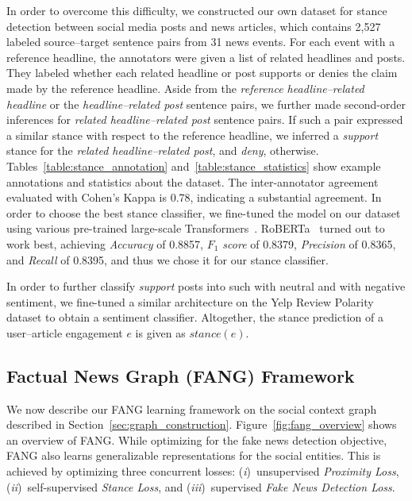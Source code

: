 \documentclass[sigconf]{acmart}
\theoremstyle{definition}
\theoremstyle{hypothesis}
\begin{document}
In order to overcome this difficulty, we constructed our own dataset for stance detection between social media posts and news articles, which contains 2,527 labeled source--target sentence pairs from 31 news events. For each event with a reference headline, the annotators were given a list of related headlines and posts. They labeled whether each related headline or post supports or denies the claim made by the reference headline. Aside from the \emph{reference headline--related headline} or the \emph{headline--related post} sentence pairs, we further made second-order inferences for \emph{related headline--related post} sentence pairs. If such a pair expressed a similar stance with respect to the reference headline, we inferred a {\it support} stance for the \emph{related headline--related post}, and \textit{deny}, otherwise. Tables~\ref{table:stance_annotation} and~\ref{table:stance_statistics} show example annotations and statistics about the dataset. The inter-annotator agreement evaluated with Cohen's Kappa is 0.78, indicating a substantial agreement. In order to choose the best stance classifier, we fine-tuned the model on our dataset using various pre-trained large-scale Transformers~\cite{devlin2019bert,liu2019roberta}. RoBERTa~\cite{liu2019roberta} turned out to work best, achieving \textit{Accuracy} of 0.8857, \textit{$F_1$ score} of 0.8379, \textit{Precision} of 0.8365, and \textit{Recall} of 0.8395, 
and thus we chose it for our stance classifier.

In order to further classify \textit{support} posts into such with neutral and with negative sentiment, we fine-tuned a similar architecture on the Yelp Review Polarity dataset to obtain a sentiment classifier. Altogether, the stance prediction of a user--article engagement $e$ is given as $stance(e)$.

\subsection{Factual News Graph (FANG) Framework}\label{sec:fang}

We now describe our FANG learning framework on the social context graph described in Section~\ref{sec:graph_construction}. Figure~\ref{fig:fang_overview} shows an overview of FANG.
While optimizing for the fake news detection objective, FANG also learns generalizable representations for the social entities. This is achieved by optimizing three concurrent losses: (\emph{i})~unsupervised \textit{Proximity Loss}, (\emph{ii})~self-supervised \textit{Stance Loss}, and (\emph{iii})~supervised \textit{Fake News Detection Loss}.
\end{document}
